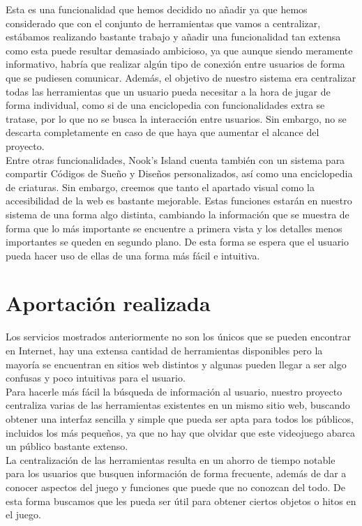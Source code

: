 Esta es una funcionalidad que hemos decidido no añadir ya que hemos considerado que con el conjunto de herramientas que vamos a centralizar, estábamos realizando bastante trabajo y añadir una funcionalidad tan extensa como esta puede resultar demasiado ambicioso, ya que aunque siendo meramente informativo, habría que realizar algún tipo de conexión entre usuarios de forma que se pudiesen comunicar. Además, el objetivo de nuestro sistema era centralizar todas las herramientas que un usuario pueda necesitar a la hora de jugar de forma individual, como si de una enciclopedia con funcionalidades extra se tratase, por lo que no se busca la interacción entre usuarios. Sin embargo, no se descarta completamente en caso de que haya que aumentar el alcance del proyecto.\\

Entre otras funcionalidades, Nook's Island cuenta también con un sistema para compartir Códigos de Sueño y Diseños personalizados, así como una enciclopedia de criaturas. Sin embargo, creemos que tanto el apartado visual como la accesibilidad de la web es bastante mejorable. Estas funciones estarán en nuestro sistema de una forma algo distinta, cambiando la información que se muestra de forma que lo más importante se encuentre a primera vista y los detalles menos importantes se queden en segundo plano. De esta forma se espera que el usuario pueda hacer uso de ellas de una forma más fácil e intuitiva.

\section{Aportación realizada}

Los servicios mostrados anteriormente no son los únicos que se pueden encontrar en Internet, hay una extensa cantidad de herramientas disponibles pero la mayoría se encuentran en sitios web distintos y algunas pueden llegar a ser algo confusas y poco intuitivas para el usuario.\\

Para hacerle más fácil la búsqueda de información al usuario, nuestro proyecto centraliza varias de las herramientas existentes en un mismo sitio web, buscando obtener una interfaz sencilla y simple que pueda ser apta para todos los públicos, incluidos los más pequeños, ya que no hay que olvidar que este videojuego abarca un público bastante extenso.\\

La centralización de las herramientas resulta en un ahorro de tiempo notable para los usuarios que busquen información de forma frecuente, además de dar a conocer aspectos del juego y funciones que puede que no conozcan del todo. De esta forma buscamos que les pueda ser útil para obtener ciertos objetos o hitos en el juego.\\

